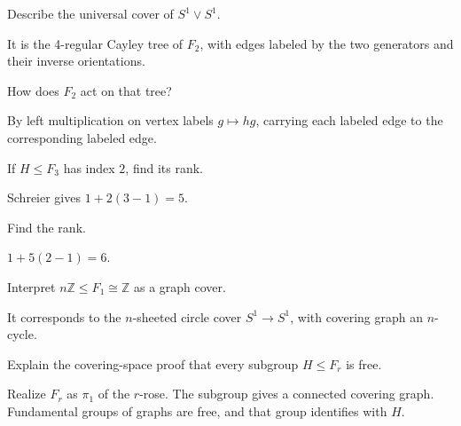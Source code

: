 \begin{problem}\label{prob:viii14-07}
Describe the universal cover of \(S^1\vee S^1\).
\end{problem}
\begin{solution}
It is the 4-regular Cayley tree of \(F_2\), with edges labeled by the two generators and their inverse orientations.
\end{solution}

\begin{problem}\label{prob:viii14-08}
How does \(F_2\) act on that tree?
\end{problem}
\begin{solution}
By left multiplication on vertex labels \(g\mapsto hg\), carrying each labeled edge to the corresponding labeled edge.
\end{solution}

\begin{problem}\label{prob:viii14-09}
If \(H\le F_3\) has index \(2\), find its rank.
\end{problem}
\begin{solution}
Schreier gives \(1+2(3-1)=5\).
\end{solution}

\begin{problem}\label{prob:viii14-10}
Find the rank.
\end{problem}
\begin{solution}
\(1+5(2-1)=6\).
\end{solution}

\begin{problem}\label{prob:viii14-11}
Interpret \(n\mathbb Z\le F_1\cong\mathbb Z\) as a graph cover.
\end{problem}
\begin{solution}
It corresponds to the \(n\)-sheeted circle cover \(S^1\to S^1\), with covering graph an \(n\)-cycle.
\end{solution}

\begin{problem}\label{prob:viii14-12}
Explain the covering-space proof that every subgroup \(H\le F_r\) is free.
\end{problem}
\begin{solution}
Realize \(F_r\) as \(\pi_1\) of the \(r\)-rose. The subgroup gives a connected covering graph. Fundamental groups of graphs are free, and that group identifies with \(H\).
\end{solution}

